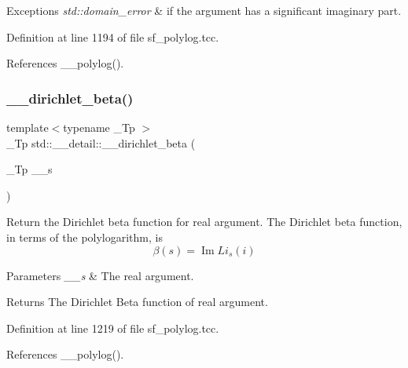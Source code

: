 \begin{DoxyExceptions}{Exceptions}
{\em std\+::domain\+\_\+error} & if the argument has a significant imaginary part. \\
\hline
\end{DoxyExceptions}


Definition at line 1194 of file sf\+\_\+polylog.\+tcc.



References \+\_\+\+\_\+polylog().

\mbox{\label{namespacestd_1_1____detail_a2e4243f8d092d48e16fc45ba0c4e9489}} 
\subsubsection{\texorpdfstring{\+\_\+\+\_\+dirichlet\+\_\+beta()}{\_\_dirichlet\_beta()}\hspace{0.1cm}{\footnotesize\ttfamily [2/2]}}
{\footnotesize\ttfamily template$<$typename \+\_\+\+Tp $>$ \\
\+\_\+\+Tp std\+::\+\_\+\+\_\+detail\+::\+\_\+\+\_\+dirichlet\+\_\+beta (\begin{DoxyParamCaption}\item[{\+\_\+\+Tp}]{\+\_\+\+\_\+s }\end{DoxyParamCaption})}

Return the Dirichlet beta function for real argument. The Dirichlet beta function, in terms of the polylogarithm, is \[ \renewcommand\Re{\operatorname{Re}} \renewcommand\Im{\operatorname{Im}} \beta(s) = \Im{Li_s(i)} \]


\begin{DoxyParams}{Parameters}
{\em \+\_\+\+\_\+s} & The real argument. \\
\hline
\end{DoxyParams}
\begin{DoxyReturn}{Returns}
The Dirichlet Beta function of real argument. 
\end{DoxyReturn}


Definition at line 1219 of file sf\+\_\+polylog.\+tcc.



References \+\_\+\+\_\+polylog().

\mbox{\label{namespacestd_1_1____detail_a3d8d694bf430ca3959c9e6b00c332468}} 
